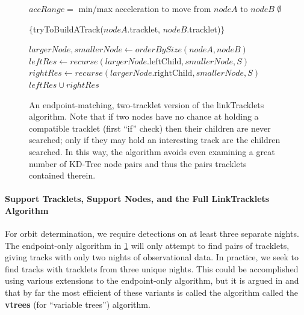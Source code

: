 \begin{figure}[ht!]
\hrulefill
\begin{algorithmic}[5]
  
  \State $accRange = $ min/max acceleration to move from $nodeA$ to $nodeB$
  \Return $\emptyset$
  \Else
  
  \State {}
    
    \Return $\{$tryToBuildATrack($nodeA$.tracklet, $nodeB$.tracklet)$\}$
    \Else
    
    \State {}


    \State $largerNode, smallerNode \gets orderBySize(nodeA, nodeB)$
    \State $leftRes \gets recurse(largerNode.\text{leftChild}, smallerNode, S)$
    \State $rightRes \gets recurse(largerNode.\text{rightChild}, smallerNode, S)$
    \Return $ leftRes \cup rightRes $
    \EndIf
    \EndIf    
  \end{algorithmic}
\hrulefill
  \caption[Simplified linkTracklets pseudocode.]{An endpoint-matching, two-tracklet version of the
    linkTracklets algorithm.  Note that if two nodes have no chance at
    holding a compatible tracklet (first ``if'' check) then their
    children are never searched; only if they may hold an interesting
    track are the children searched.  In this way, the algorithm
    avoids even examining a great number of KD-Tree node pairs and
    thus the pairs tracklets contained therein.}
  \label{simplifiedLinkTracklets}
\end{figure}

\paragraph{Support Tracklets, Support Nodes, and the Full LinkTracklets Algorithm}

For orbit determination, we require detections on at least three separate
nights.  The endpoint-only algorithm in \ref{simplifiedLinkTracklets}
will only attempt to find pairs of tracklets, giving tracks with only
two nights of observational data.  In practice, we seek to find tracks
with tracklets from three unique nights.  This could be accomplished
using various extensions to the endpoint-only algorithm, but it is
argued in \citet{kubica_thesis} and
\citet{Kubica:2005:MTA:1081870.1081889} that by far the most efficient
of these variants is called the algorithm called the {\bf vtrees} (for
``variable trees'') algorithm.

